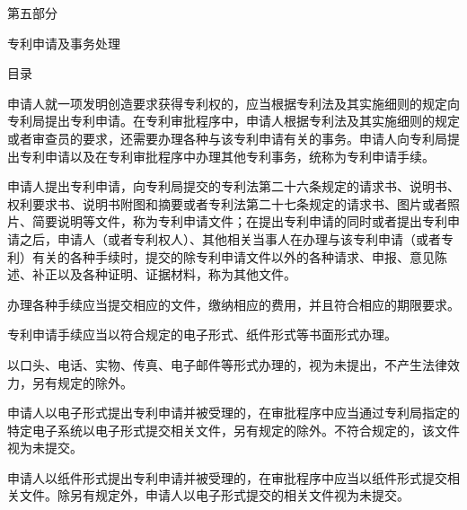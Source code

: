 \cleardoublepage{}\resetchapters
\thispagestyle{plainempty}\hypertarget{gpos.p5}{}\begingroup\centering\guidecenterpage
\dadati\fontsize{29.04bp}{43bp}\selectfont
\vspace*{242bp}
第五部分\par
专利申请及事务处理\par
{}
{}
\endgroup\clearpage
\cleardoublepage\pagestyle{tocpage}
\gdef\guidetabcontent{\hbox{第}\hbox{五}\hbox{部}\hbox{分}}
{\centering\guidecenterpage\heiti\fontsize{14.04bp}{21bp}\selectfont 目\quad 录\par}
\vspace{6bp}
\clearpage\pagestyle{main}
申请人就一项发明创造要求获得专利权的，应当根据专利法及其实施细则的规定向专利局提出专利申请。在专利审批程序中，申请人根据专利法及其实施细则的规定或者审查员的要求，还需要办理各种与该专利申请有关的事务。申请人向专利局提出专利申请以及在专利审批程序中办理其他专利事务，统称为专利申请手续。

申请人提出专利申请，向专利局提交的专利法第二十六条规定的请求书、说明书、权利要求书、说明书附图和摘要或者专利法第二十七条规定的请求书、图片或者照片、简要说明等文件，称为专利申请文件；在提出专利申请的同时或者提出专利申请之后，申请人（或者专利权人）、其他相关当事人在办理与该专利申请（或者专利）有关的各种手续时，提交的除专利申请文件以外的各种请求、申报、意见陈述、补正以及各种证明、证据材料，称为其他文件。

办理各种手续应当提交相应的文件，缴纳相应的费用，并且符合相应的期限要求。

专利申请手续应当以符合规定的电子形式、纸件形式等书面形式办理。

以口头、电话、实物、传真、电子邮件等形式办理的，视为未提出，不产生法律效力，另有规定的除外。

申请人以电子形式提出专利申请并被受理的，在审批程序中应当通过专利局指定的特定电子系统以电子形式提交相关文件，另有规定的除外。不符合规定的，该文件视为未提交。

申请人以纸件形式提出专利申请并被受理的，在审批程序中应当以纸件形式提交相关文件。除另有规定外，申请人以电子形式提交的相关文件视为未提交。

